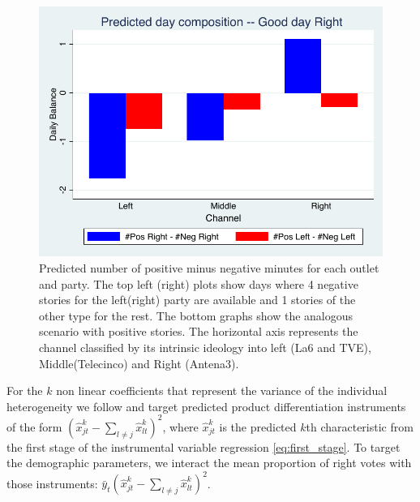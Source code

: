 \documentclass[12pt]{article}
\begin{document}
\begin{figure}[ht]
\begin{minipage}[b]{0.5\linewidth}
		\vspace{4ex}
	\end{minipage}%
	\begin{minipage}[b]{0.5\linewidth}

		\centering
		\includegraphics[width=.9\linewidth]{figures/predicted_good_right} 
		\vspace{4ex}
	\end{minipage} 

			\label{fig:prediction} 
	\caption{Predicted number of positive minus negative minutes for each outlet and party. The top left (right) plots show days where 4 negative stories for the left(right) party are available and 1 stories of the other type for the rest. The bottom graphs show the analogous scenario with positive stories. 
		The horizontal axis represents the channel classified by its intrinsic ideology into left (La6 and TVE), Middle(Telecinco) and Right (Antena3).  } 


\end{figure}


For the $ k $ non linear coefficients that represent the variance of the individual heterogeneity we follow \cite{gandhi2019measuring} and target predicted product differentiation instruments of the form $ \left(\hat{x}_{jt}^k- \sum_{l \neq j} \hat{x}_{lt}^k\right)^2 $, where $ \hat{x}_{jt}^k $ is the predicted $ k $th characteristic from the first stage of the instrumental variable regression \ref{eq:first_stage}. To target the demographic parameters, we interact the mean proportion of right votes with those instruments: $ \bar{y}_t\left(\hat{x}_{jt}^k- \sum_{l \neq j} \hat{x}_{lt}^k\right)^2 $.
\end{document}
